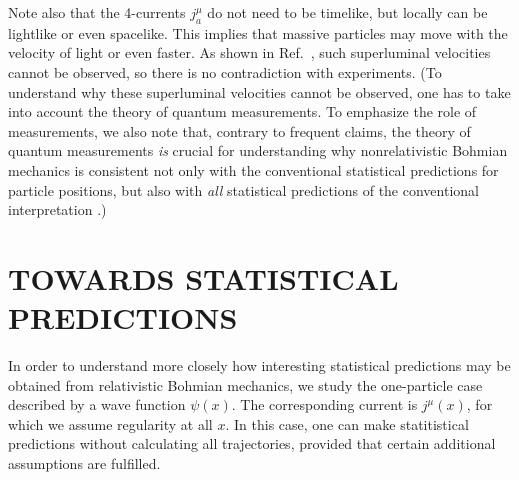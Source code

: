 \documentclass[12pt]{article}
\begin{document}
Note also that the 4-currents $j^{\mu}_a$ do not need 
to be timelike, but locally can be lightlike or even spacelike.
This implies that massive particles may move with the 
velocity of light or even faster. As shown in Ref.~\cite{nikoldbb1},
such superluminal velocities cannot be observed, so there is no 
contradiction with experiments.  
(To understand why these superluminal velocities cannot be observed, 
one has to take into account the theory 
of quantum measurements. To emphasize the role of measurements, 
we also note that, contrary to frequent claims,
the theory of quantum measurements 
{\em is} crucial for understanding why nonrelativistic Bohmian 
mechanics is consistent not only
with the conventional statistical predictions for particle positions,
but also with {\em all} statistical 
predictions of the conventional interpretation
\cite{bohm,bohmPR1,holbook,nikoldbb1}.)  

\section{TOWARDS STATISTICAL PREDICTIONS}
\label{secSP}

In order to understand more closely how interesting 
statistical predictions may be obtained from relativistic
Bohmian mechanics, we study the one-particle case described by a 
wave function $\psi(x)$. The corresponding
current is $j^{\mu}(x)$, for which we assume regularity  
at all $x$. In this case,
one can make statitistical predictions without calculating 
all trajectories, provided that certain additional 
assumptions are fulfilled. 
\end{document}
